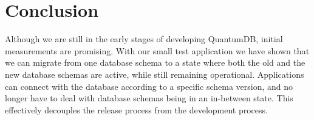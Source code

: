 \documentclass[conference]{IEEEtran}
\begin{document}
\section{Conclusion} 

Although we are still in the early stages of developing QuantumDB, initial measurements are promising. With our small test application we have shown that we can migrate from one database schema to a state where both the old and the new database schemas are active, while still remaining operational. Applications can connect with the database according to a specific schema version, and no longer have to deal with database schemas being in an in-between state. This effectively decouples the release process from the development process.















%
%
%




% 
% 




\end{document}
